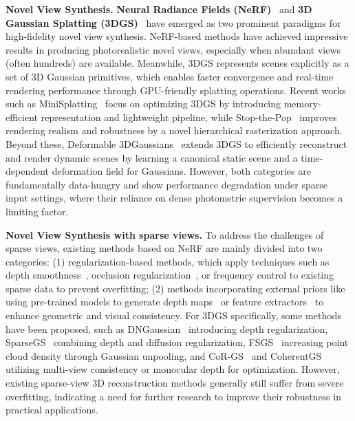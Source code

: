 \textbf{Novel View Synthesis.}
\textbf{Neural Radiance Fields (NeRF)}~\cite{mildenhall2021nerf, barron2022mip, bao2023and} and \textbf{3D Gaussian Splatting (3DGS)}~\cite{kerbl20233d} have emerged as two prominent paradigms for high-fidelity novel view synthesis. NeRF-based methods have achieved impressive results in producing photorealistic novel views, especially when abundant views (often hundreds) are available. Meanwhile, 3DGS represents scenes explicitly as a set of 3D Gaussian primitives, which enables faster convergence and real-time rendering performance through GPU-friendly splatting operations. Recent works such as MiniSplatting~\cite{kaiser2024minisplatting} focus on optimizing 3DGS by introducing memory-efficient representation and lightweight pipeline, while Stop-the-Pop~\cite{radl2024stopthepop} improves rendering realism and robustness by a novel hierarchical rasterization approach. Beyond these, Deformable 3DGaussians~\cite{yang2023deformable3dgs} extends 3DGS to efficiently reconstruct and render dynamic scenes by learning a canonical static scene and a time-dependent deformation field for Gaussians. However, both categories are fundamentally data-hungry and show performance degradation under sparse input settings, where their reliance on dense photometric supervision becomes a limiting factor.

\textbf{Novel View Synthesis with sparse views.}
To address the challenges of sparse views, existing methods based on NeRF are mainly divided into two categories: (1) regularization-based methods, which apply techniques such as depth smoothness~\cite{ niemeyer2022regnerf}, occlusion regularization~\cite{yang2023freenerf}, or frequency control to existing sparse data to prevent overfitting; (2) methods incorporating external priors like using pre-trained models to generate depth maps~\cite{chen2021mvsnerf, fan2024instantsplat, jang2021codenerf, yu2021pixelnerf} or feature extractors~\cite{jain2021putting, kwak2023geconerf} to enhance geometric and visual consistency. For 3DGS specifically, some methods have been proposed, such as DNGaussian~\cite{li2024dngaussian} introducing depth regularization, SparseGS~\cite{xiong2024sparsegs} combining depth and diffusion regularization, FSGS~\cite{zhu2024fsgs} increasing point cloud density through Gaussian unpooling, and CoR-GS~\cite{zhang2024cor} and CoherentGS~\cite{paliwal2024coherentgs} utilizing multi-view consistency or monocular depth for optimization. However, existing sparse-view 3D reconstruction methods generally still suffer from severe overfitting, indicating a need for further research to improve their robustness in practical applications.















